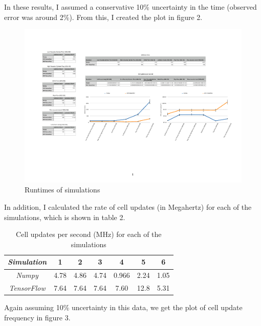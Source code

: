 \documentclass{article}
\begin{document}
In these results, I assumed a conservative 10\% uncertainty in the time (observed error was around 2\%). From this, I created the plot in figure 2.

\begin{figure}[H] 
	\centering
	\label{timegraph}
	\includegraphics[width=5in]{Diagrams/TimeGraph.pdf}
	\caption{Runtimes of simulations}
\end{figure}

In addition, I calculated the rate of cell updates (in Megahertz) for each of the simulations, which is shown in table 2.

\begin{table}[H]
\caption{Cell updates per second (MHz) for each of the simulations}
\begin{center}
\begin{tabular}{c||c|c|c|c|c|c}
\emph{Simulation} & 1 & 2 & 3 & 4 & 5 & 6\\
\hline
\hline
\emph{Numpy} & 4.78 & 4.86 & 4.74 & 0.966 & 2.24 & 1.05 \\
\hline
\emph{TensorFlow} & 7.64 & 7.64 & 7.64 & 7.60 & 12.8 & 5.31 \\
\hline
\end{tabular}
\end{center}
\end{table}

Again assuming 10\% uncertainty in this data, we get the plot of cell update frequency in figure 3.
\end{document}
